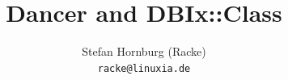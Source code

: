 \usepackage[utf8]{inputenc}
\usepackage[T1]{fontenc}
\usepackage{mathptmx}
\usepackage[scaled=.90]{helvet}
\usepackage{courier}
\usepackage{caption}
\captionsetup{labelformat=empty,labelsep=none}
\usepackage{verbatim}
\usepackage{hyperref}
\usepackage{listings}
\usepackage{ulem}
\lstset{language=Perl,basicstyle=\normalsize,tabsize=3,showstringspaces=false}

\title{Dancer and DBIx::Class}
\author[racke]{Stefan Hornburg (Racke)\\ \texttt{racke@linuxia.de}}


\maketitle{}

\begin{frame}
  \titlepage
\end{frame}

\tableofcontents








